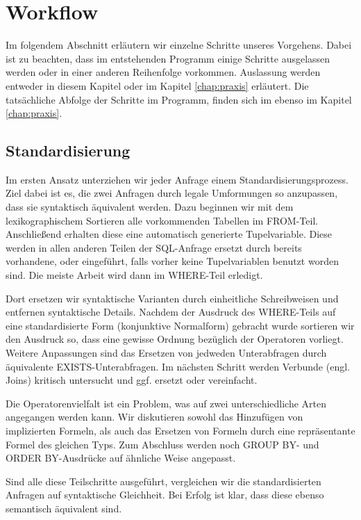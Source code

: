 \section{Workflow}

Im folgendem Abschnitt erläutern wir einzelne Schritte unseres Vorgehens. Dabei ist zu beachten, dass im entstehenden Programm einige Schritte ausgelassen werden oder in einer anderen Reihenfolge vorkommen. Auslassung werden entweder in diesem Kapitel oder im Kapitel \ref{chap:praxis} erläutert. Die tatsächliche Abfolge der Schritte im Programm, finden sich im ebenso im Kapitel \ref{chap:praxis}.

\subsection{Standardisierung}

Im ersten Ansatz unterziehen wir jeder Anfrage einem Standardisierungsprozess. Ziel dabei ist es, die zwei Anfragen durch legale Umformungen so anzupassen, dass sie syntaktisch äquivalent werden. Dazu beginnen wir mit dem lexikographischem Sortieren alle vorkommenden Tabellen im FROM-Teil. Anschließend erhalten diese eine automatisch generierte Tupelvariable. Diese werden in allen anderen Teilen der SQL-Anfrage ersetzt durch bereits vorhandene, oder eingeführt, falls vorher keine Tupelvariablen benutzt worden sind. Die meiste Arbeit wird dann im WHERE-Teil erledigt. 

Dort ersetzen wir syntaktische Varianten durch einheitliche Schreibweisen und entfernen syntaktische Details. Nachdem der Ausdruck des WHERE-Teils auf eine standardisierte Form (konjunktive Normalform) gebracht wurde sortieren wir den Ausdruck so, dass eine gewisse Ordnung bezüglich der Operatoren vorliegt. Weitere Anpassungen sind das Ersetzen von jedweden Unterabfragen durch äquivalente EXISTS-Unterabfragen. Im nächsten Schritt werden Verbunde (engl. Joins) kritisch untersucht und ggf. ersetzt oder vereinfacht. 

Die Operatorenvielfalt ist ein Problem, was auf zwei unterschiedliche Arten angegangen werden kann. Wir diskutieren sowohl das Hinzufügen von implizierten Formeln, als auch das Ersetzen von Formeln durch eine repräsentante Formel des gleichen Typs. Zum Abschluss werden noch GROUP BY- und ORDER BY-Ausdrücke auf ähnliche Weise angepasst.

Sind alle diese Teilschritte ausgeführt, vergleichen wir die standardisierten Anfragen auf syntaktische Gleichheit. Bei Erfolg ist klar, dass diese ebenso semantisch äquivalent sind.

